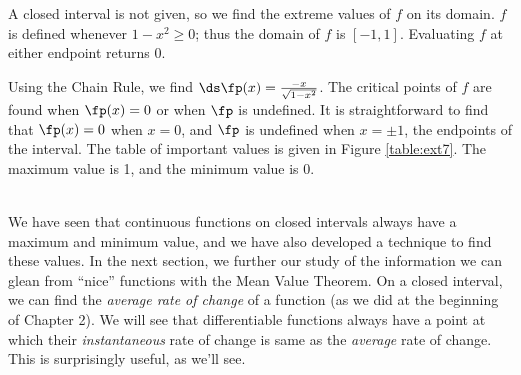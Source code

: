 {A closed interval is not given, so we find the extreme values of $f$ on its domain. $f$ is defined whenever $1-x^2\geq 0$; thus the domain of $f$ is $[-1,1]$. Evaluating $f$ at either endpoint returns 0. 


Using the Chain Rule, we find $\ds \fp(x) = \frac{-x}{\sqrt{1-x^2}}$. The critical points of $f$ are found when $\fp(x) = 0$ or when $\fp$ is undefined. It is straightforward to find that $\fp(x) = 0$ when $x=0$, and $\fp$ is undefined when $x=\pm 1$, the endpoints of the interval. The table of important values is given in Figure \ref{table:ext7}. The maximum value is 1, and the minimum value is 0.
}\\




We have seen that continuous functions on closed intervals always have a maximum and minimum value, and we have also developed a technique to find these values. In the next section, we further our study of the information we can glean from ``nice'' functions with the Mean Value Theorem. On a closed interval, we can find the \textit{average rate of change} of a function (as we did at the beginning of Chapter 2). We will see that differentiable functions always have a point at which their \textit{instantaneous} rate of change is same as the \textit{average} rate of change. This is surprisingly useful, as we'll see.





